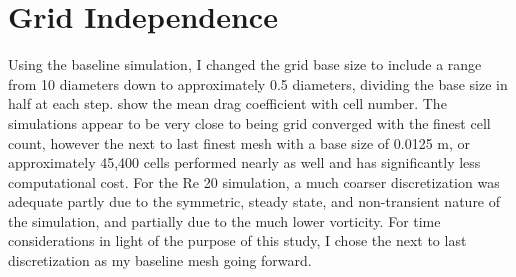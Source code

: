 \documentclass[10pt,english]{article}
\begin{document}
\section{Grid Independence}

Using the baseline simulation, I changed the grid base size to include a range from 10 diameters down to approximately 0.5 diameters, dividing the base size in half at each step.   show the mean drag coefficient with cell number.  The simulations appear to be very close to being grid converged with the finest cell count, however the next to last finest mesh with a base size of 0.0125 m, or approximately 45,400 cells performed nearly as well and has significantly less computational cost.  For the Re 20 simulation, a much coarser discretization was adequate partly due to the symmetric, steady state, and non-transient nature of the simulation, and partially due to the much lower vorticity.  For time considerations in light of the purpose of this study, I chose the next to last discretization as my baseline mesh going forward.  
\end{document}
